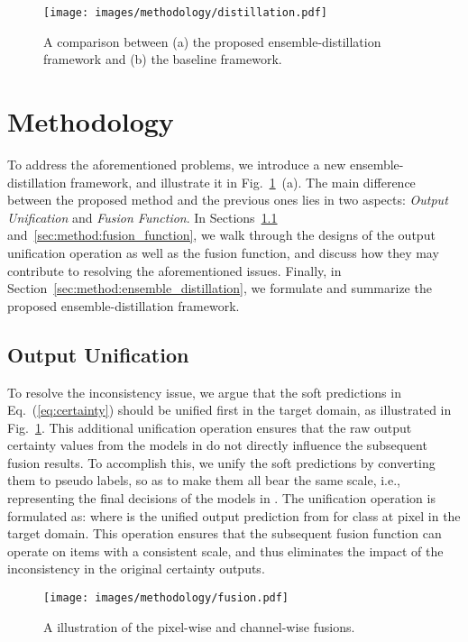 \documentclass[final]{cvpr}
\begin{document}
\begin{figure}[t]
\texttt{[image: images/methodology/distillation.pdf]}
    \caption{A comparison between (a) the proposed ensemble-distillation framework and (b) the baseline framework.}
    \label{fig:distillation}
\end{figure} \section{Methodology}
\label{sec:methodology}
To address the aforementioned problems, we introduce a new ensemble-distillation framework, and illustrate it in Fig.~\ref{fig:distillation}~(a). The main difference between the proposed method and the previous ones lies in two aspects: \textit{Output Unification} and \textit{Fusion Function}. In Sections~\ref{sec:method:output_unification} and~\ref{sec:method:fusion_function}, we walk through the designs of the output unification operation as well as the fusion function, and discuss how they may contribute to resolving the aforementioned issues. Finally, in Section~\ref{sec:method:ensemble_distillation}, we formulate and summarize the proposed ensemble-distillation framework.

\subsection{Output Unification}
\label{sec:method:output_unification}
To resolve the inconsistency issue, we argue that the soft predictions  in Eq.~(\ref{eq:certainty}) should be unified first in the target domain, as illustrated in Fig.~\ref{fig:distillation}.  This additional unification operation ensures that the raw output certainty values from the models in  do not directly influence the subsequent fusion results. To accomplish this, we unify the soft predictions by converting them to pseudo labels, so as to make them all bear the same scale, i.e., representing the final decisions of the models in . The unification operation is formulated as:
 where  is the unified output prediction from  for class  at pixel  in the target domain. This operation ensures that the subsequent fusion function can operate on items with a consistent scale, and thus eliminates the impact of the inconsistency in the original certainty outputs.

\begin{figure}[t]
    \texttt{[image: images/methodology/fusion.pdf]}
    \caption{A illustration of the pixel-wise and channel-wise fusions.}
    \label{fig:channel_wise}
\end{figure}
\end{document}

